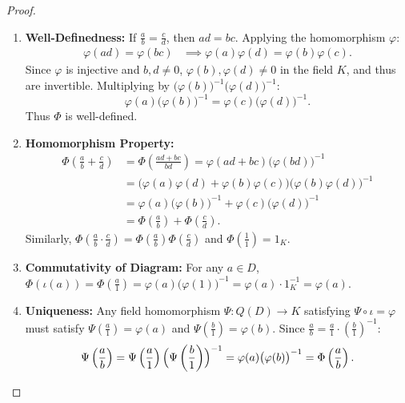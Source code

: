 \begin{proof}
\begin{enumerate}[label=\arabic*., leftmargin=*]
    \item \textbf{Well-Definedness:}
    If $\frac{a}{b} = \frac{c}{d}$, then $ad = bc$.
    Applying the homomorphism $\varphi$:
    \begin{align*}
    \varphi(ad) = \varphi(bc) 
    &\implies \varphi(a)\varphi(d) = \varphi(b)\varphi(c).
    \end{align*}
    Since $\varphi$ is injective and $b, d \ne 0$, $\varphi(b), \varphi(d) \ne 0$ in the field $K$, and thus are invertible.
    Multiplying by $\bigl(\varphi(b)\bigr)^{-1}\bigl(\varphi(d)\bigr)^{-1}$:
    \begin{equation*}
    \varphi(a)\bigl(\varphi(b)\bigr)^{-1} = \varphi(c)\bigl(\varphi(d)\bigr)^{-1}.
    \end{equation*}
    Thus $\Phi$ is well-defined.

    \item \textbf{Homomorphism Property:}
    \begin{align*}
    \Phi\left(\frac{a}{b} + \frac{c}{d}\right) &= \Phi\left(\frac{ad+bc}{bd}\right) = \varphi(ad+bc)\bigl(\varphi(bd)\bigr)^{-1} \\
    &= \bigl(\varphi(a)\varphi(d) + \varphi(b)\varphi(c)\bigr)\bigl(\varphi(b)\varphi(d)\bigr)^{-1} \\
    &= \varphi(a)\bigl(\varphi(b)\bigr)^{-1} + \varphi(c)\bigl(\varphi(d)\bigr)^{-1} \\
    &= \Phi\left(\frac{a}{b}\right) + \Phi\left(\frac{c}{d}\right).
    \end{align*}
    Similarly, $\Phi\left(\frac{a}{b} \cdot \frac{c}{d}\right) = \Phi\left(\frac{a}{b}\right)\Phi\left(\frac{c}{d}\right)$ and $\Phi\left(\frac{1}{1}\right) = 1_K$.

    \item \textbf{Commutativity of Diagram:}
    For any $a \in D$, $\Phi(\iota(a)) = \Phi\left(\frac{a}{1}\right) = \varphi(a)\bigl(\varphi(1)\bigr)^{-1} = \varphi(a) \cdot 1_K^{-1} = \varphi(a)$.

    \item \textbf{Uniqueness:}
    Any field homomorphism $\Psi: Q(D) \to K$ satisfying $\Psi \circ \iota = \varphi$ must satisfy $\Psi\left(\frac{a}{1}\right) = \varphi(a)$ and $\Psi\left(\frac{b}{1}\right) = \varphi(b)$.
    Since $\frac{a}{b} = \frac{a}{1} \cdot \left(\frac{b}{1}\right)^{-1}$:
    \begin{equation*}
    \Psi\left(\frac{a}{b}\right) = \Psi\left(\frac{a}{1}\right)\Bigl(\Psi\left(\frac{b}{1}\right)\Bigr)^{-1} = \varphi(a)\bigl(\varphi(b)\bigr)^{-1} = \Phi\left(\frac{a}{b}\right).
    \end{equation*}
\end{enumerate}
\end{proof}


